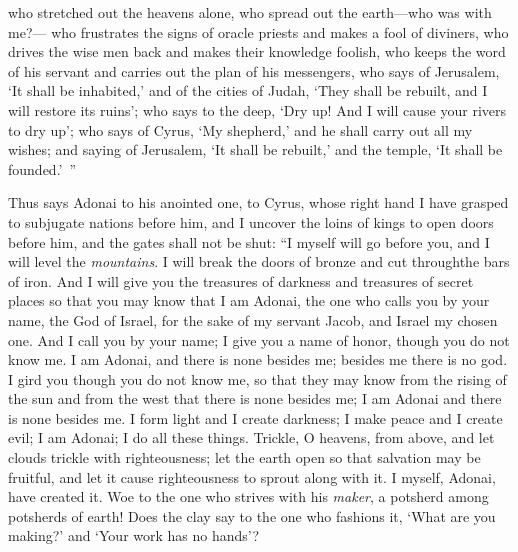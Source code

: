 \begin{biblechapter}
who stretched out the heavens alone, 
who spread out the earth—who was with me?—
\verse who frustrates the signs of oracle priests 
and makes a fool of diviners, 
who drives the wise men back 
and makes their knowledge foolish,
\verse who keeps the word of his servant 
and carries out the plan of his messengers, 
who says of Jerusalem, ‘It shall be inhabited,’ 
and of the cities of Judah, ‘They shall be rebuilt, 
and I will restore its ruins’;
\verse who says to the deep, ‘Dry up! 
And I will cause your rivers to dry up’;
\verse who says of Cyrus, ‘My shepherd,’ 
and he shall carry out all my wishes; 
and saying of Jerusalem, ‘It shall be rebuilt,’ 
and the temple, ‘It shall be founded.’ ”
\end{biblechapter}

\begin{biblechapter} %
\verse Thus says Adonai to his anointed one, 
to Cyrus, whose right hand I have grasped 
to subjugate nations before him, 
and I uncover the loins of kings 
to open doors before him, 
and the gates shall not be shut:
\verse “I myself will go before you, 
and I will level the \textit{mountains}. 
I will break the doors of bronze 
and cut throughthe bars of iron.
\verse And I will give you the treasures of darkness 
and treasures of secret places 
so that you may know that I am Adonai, 
the one who calls you by your name, the God of Israel,
\verse for the sake of my servant Jacob, 
and Israel my chosen one. 
And I call you by your name; 
I give you a name of honor, though you do not know me.
\verse I am Adonai, and there is none besides me; 
besides me there is no god. 
I gird you though you do not know me,
\verse so that they may know from the rising of the sun 
and from the west that there is none besides me; 
I am Adonai and there is none besides me.
\verse I form light and I create darkness; 
I make peace and I create evil; 
I am Adonai; I do all these things.
\verse Trickle, O heavens, from above, 
and let clouds trickle with righteousness; 
let the earth open so that salvation may be fruitful, 
and let it cause righteousness to sprout along with it. 
I myself, Adonai, have created it.
\verse Woe to the one who strives with his \textit{maker}, 
a potsherd among potsherds of earth! 
Does the clay say to the one who fashions it, 
‘What are you making?’ 
and ‘Your work has no hands’?

\end{biblechapter}
